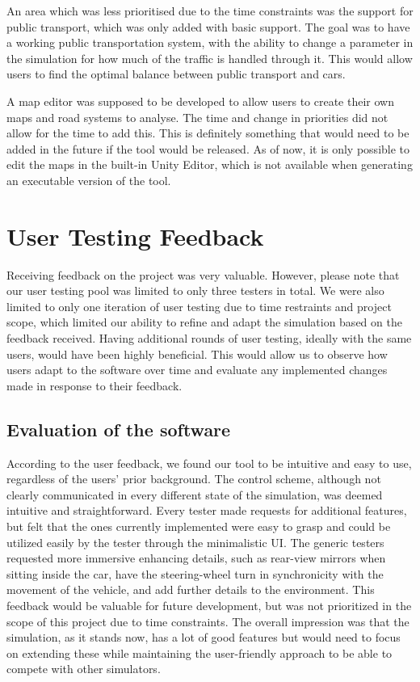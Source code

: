     An area which was less prioritised due to the time constraints was the support for public transport, which was only added with basic support. The goal was to have a working public transportation system, with the ability to change a parameter in the simulation for how much of the traffic is handled through it. This would allow users to find the optimal balance between public transport and cars.

    A map editor was supposed to be developed to allow users to create their own maps and road systems to analyse. The time and change in priorities did not allow for the time to add this. This is definitely something that would need to be added in the future if the tool would be released. As of now, it is only possible to edit the maps in the built-in Unity Editor, which is not available when generating an executable version of the tool.

\section{User Testing Feedback}
    Receiving feedback on the project was very valuable. However, please note that our user testing pool was limited to only three testers in total. We were also limited to only one iteration of user testing due to time restraints and project scope, which limited our ability to refine and adapt the simulation based on the feedback received. Having additional rounds of user testing, ideally with the same users, would have been highly beneficial. This would allow us to observe how users adapt to the software over time and evaluate any implemented changes made in response to their feedback.
    
    \subsection{Evaluation of the software}
    According to the user feedback, we found our tool to be intuitive and easy to use, regardless of the users' prior background. The control scheme, although not clearly communicated in every different state of the simulation, was deemed intuitive and straightforward.  Every tester made requests for additional features, but felt that the ones currently implemented were easy to grasp and could be utilized easily by the tester through the minimalistic UI. The generic testers requested more immersive enhancing details, such as rear-view mirrors when sitting inside the car, have the steering-wheel turn in synchronicity with the movement of the vehicle, and add further details to the environment. This feedback would be valuable for future development, but was not prioritized in the scope of this project due to time constraints. The overall impression was that the simulation, as it stands now, has a lot of good features but would need to focus on extending these while maintaining the user-friendly approach to be able to compete with other simulators. 
    
